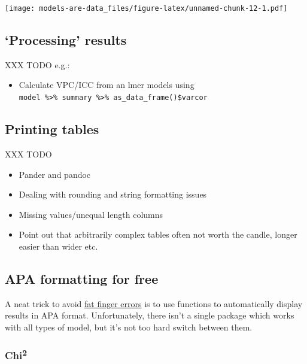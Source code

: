 \documentclass[]{article}
\providecommand{\tightlist}{%
  \setlength{\itemsep}{0pt}\setlength{\parskip}{0pt}}
\theoremstyle{definition}
\theoremstyle{definition}
\theoremstyle{definition}
\theoremstyle{remark}
\begin{document}
\texttt{[image: models-are-data\_files/figure-latex/unnamed-chunk-12-1.pdf]}

\subsection*{\texorpdfstring{`Processing'
results}{Processing results}}\label{process-model-results}

XXX TODO e.g.:

\begin{itemize}
\tightlist
\item
  Calculate VPC/ICC from an lmer models using
  \texttt{model\ \%\textgreater{}\%\ summary\ \%\textgreater{}\%\ as\_data\_frame()\$varcor}
\end{itemize}

\subsection*{Printing tables}\label{output-tables}

XXX TODO

\begin{itemize}
\tightlist
\item
  Pander and pandoc
\item
  Dealing with rounding and string formatting issues
\item
  Missing values/unequal length columns
\item
  Point out that arbitrarily complex tables often not worth the candle,
  longer easier than wider etc.
\end{itemize}

\hypertarget{apa-output}{\subsection*{APA formatting for
free}\label{apa-output}}

A neat trick to avoid
\href{https://en.wikipedia.org/wiki/Fat-finger_error}{fat finger errors}
is to use functions to automatically display results in APA format.
Unfortunately, there isn't a single package which works with all types
of model, but it's not too hard switch between them.

\subsubsection*{\texorpdfstring{Chi\textsuperscript{2}}{Chi2}}\label{chi2}
\end{document}
